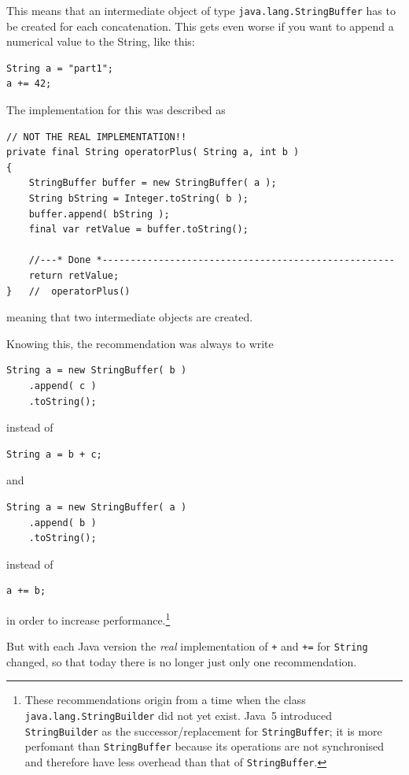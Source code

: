 \documentclass[11pt,a4paper, titlepage, parskip=half, headsepline, footsepline, cleardoublepage=current, headheight=1cm]{scrbook}
\begin{document}
This means that an intermediate object of type \lstinline|java.lang.StringBuffer|\autocite{ORACLE_DOC_STRINGBUFFER_CLASS} has to be created for each concatenation. This gets even worse if you want to append a numerical value to the String, like this:
\begin{lstlisting}
String a = "part1";
a += 42;
\end{lstlisting}

The implementation for this was described as
\begin{lstlisting}
// NOT THE REAL IMPLEMENTATION!!
private final String operatorPlus( String a, int b )
{
    StringBuffer buffer = new StringBuffer( a );
    String bString = Integer.toString( b );
    buffer.append( bString );
    final var retValue = buffer.toString();
    
    //---* Done *----------------------------------------------------
    return retValue;
}   //  operatorPlus()
\end{lstlisting}
meaning that two intermediate objects are created.

Knowing this, the recommendation was always to write
\begin{lstlisting}
String a = new StringBuffer( b )
    .append( c )
    .toString();
\end{lstlisting}
instead of
\begin{lstlisting}
String a = b + c;
\end{lstlisting}
and
\begin{lstlisting}
String a = new StringBuffer( a )
    .append( b )
    .toString();
\end{lstlisting}
instead of
\begin{lstlisting}
a += b;
\end{lstlisting}
in order to increase performance.\footnote{These recommendations origin from a time when the class \lstinline|java.lang.StringBuilder|\autocite{ORACLE_DOC_STRINGBUILDER_CLASS} did not yet exist. Java~5 introduced \lstinline|StringBuilder| as the successor/replacement for \lstinline|StringBuffer|; it is more perfomant than \lstinline|StringBuffer| because its operations are not synchronised and therefore have less overhead than that of \lstinline|StringBuffer|.}

But with each Java version the \textit{real} implementation of \lstinline|+| and \lstinline|+=| for \lstinline|String| changed, so that today there is no longer just only one recommendation.
\end{document}
